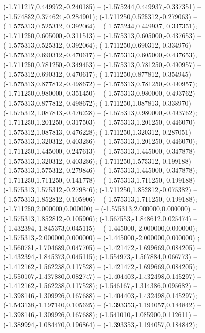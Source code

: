  (-1.711217,0.449972,-0.240185) -- (-1.575244,0.449937,-0.337351) -- (-1.574882,0.374624,-0.284901);
 (-1.711250,0.525312,-0.279063) -- (-1.575313,0.525312,-0.392064) -- (-1.575244,0.449937,-0.337351);
 (-1.711250,0.605000,-0.311513) -- (-1.575313,0.605000,-0.437653) -- (-1.575313,0.525312,-0.392064);
 (-1.711250,0.690312,-0.334976) -- (-1.575312,0.690312,-0.470617) -- (-1.575313,0.605000,-0.437653);
 (-1.711250,0.781250,-0.349453) -- (-1.575313,0.781250,-0.490957) -- (-1.575312,0.690312,-0.470617);
 (-1.711250,0.877812,-0.354945) -- (-1.575313,0.877812,-0.498672) -- (-1.575313,0.781250,-0.490957);
 (-1.711250,0.980000,-0.351450) -- (-1.575313,0.980000,-0.493762) -- (-1.575313,0.877812,-0.498672);
 (-1.711250,1.087813,-0.338970) -- (-1.575312,1.087813,-0.476228) -- (-1.575313,0.980000,-0.493762);
 (-1.711250,1.201250,-0.317503) -- (-1.575313,1.201250,-0.446070) -- (-1.575312,1.087813,-0.476228);
 (-1.711250,1.320312,-0.287051) -- (-1.575313,1.320312,-0.403286) -- (-1.575313,1.201250,-0.446070);
 (-1.711250,1.445000,-0.247613) -- (-1.575313,1.445000,-0.347878) -- (-1.575313,1.320312,-0.403286);
 (-1.711250,1.575312,-0.199188) -- (-1.575313,1.575312,-0.279846) -- (-1.575313,1.445000,-0.347878);
 (-1.711250,1.711250,-0.141778) -- (-1.575313,1.711250,-0.199188) -- (-1.575313,1.575312,-0.279846);
 (-1.711250,1.852812,-0.075382) -- (-1.575313,1.852812,-0.105906) -- (-1.575313,1.711250,-0.199188);
 (-1.711250,2.000000,0.000000) -- (-1.575313,2.000000,0.000000) -- (-1.575313,1.852812,-0.105906);
 (-1.567553,-1.848612,0.025474) -- (-1.432394,-1.845373,0.045115) -- (-1.445000,-2.000000,0.000000);
 (-1.575313,-2.000000,0.000000) -- (-1.445000,-2.000000,0.000000) ;
 (-1.560781,-1.704689,0.047705) -- (-1.421472,-1.699669,0.084205) -- (-1.432394,-1.845373,0.045115);
 (-1.554973,-1.567884,0.066773) -- (-1.412162,-1.562238,0.117528) -- (-1.421472,-1.699669,0.084205);
 (-1.550107,-1.437880,0.082747) -- (-1.404403,-1.432498,0.145297) -- (-1.412162,-1.562238,0.117528);
 (-1.546167,-1.314386,0.095682) -- (-1.398146,-1.309926,0.167688) -- (-1.404403,-1.432498,0.145297);
 (-1.543138,-1.197140,0.105625) -- (-1.393353,-1.194057,0.184842) -- (-1.398146,-1.309926,0.167688);
 (-1.541010,-1.085900,0.112611) -- (-1.389994,-1.084470,0.196864) -- (-1.393353,-1.194057,0.184842);

